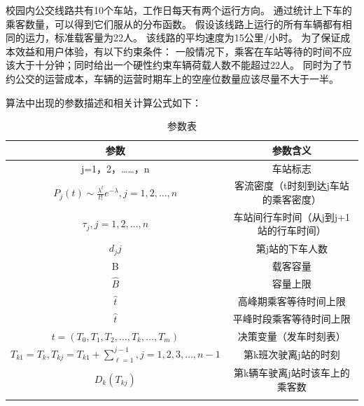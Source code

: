校园内公交线路共有10个车站，工作日每天有两个运行方向。
通过统计上下车的乘客数量，可以得到它们服从的分布函数。
假设该线路上运行的所有车辆都有相同的运力，标准载客量为22人。
该线路的平均速度为15公里/小时。
为了保证成本效益和用户体验，有以下约束条件：
一般情况下，乘客在车站等待的时间不应该大于十分钟；同时给出一个硬性约束车辆荷载人数不能超过22人。
同时为了节约公交的运营成本，车辆的运营时期车上的空座位数量应该尽量不大于一半。




算法中出现的参数描述和相关计算公式如下：
\begin{table}[htbp!]
    \centering
    \caption{参数表}\label{teble_3}
    \begin{tabular}{cc}
        \whline
        参数 & 参数含义 \\
        \hline
        j=1，2，……，n & 车站标志\\
        $P_j(t) \sim \frac{\lambda^t}{t!}e^{-\lambda},j=1,2,…,n$ & 客流密度（t时刻到达j车站的乘客密度）\\
        $\tau_j,j=1,2,…,n$ & 车站间行车时间（从j到j+1站的行车时间）\\
        $d_j{j}$ & 第j站的下车人数\\
        B & 载客容量 \\
        $\hat{B}$ & 容量上限\\
        $\widehat{t}$ &  高峰期乘客等待时间上限 \\
        $\hat{t}$ & 平峰时段乘客等待时间上限 \\
        $t = (T_0,T_1,T_2,…,T_k,…,T_m)$ & 决策变量（发车时刻表）\\
        $T_{k1} = T_k, T_{kj} = T_{k1} + \sum_{\ell = 1}^{j-1}, j = 1, 2, 3, …,n-1$ & 第k班次驶离j站的时刻 \\
        $D_k(T_{kj})$ & 第k辆车驶离j站时该车上的乘客数\\
        \whline
    \end{tabular}
\end{table}


